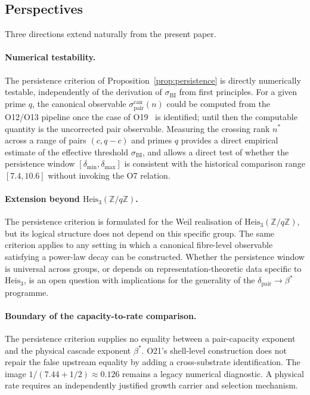 \documentclass[11pt,a4paper]{article}
\theoremstyle{definition}
\theoremstyle{remark}
\newcommand{\bstar}{\beta^*}
\begin{document}
    \subsection{Perspectives}
      \label{sec:perspectives}

      Three directions extend naturally from the present paper.

      \paragraph{Numerical testability.}
        The persistence criterion of Proposition~\ref{prop:persistence} is
        directly numerically testable, independently of the derivation of
        $\sigma_{\mathrm{BI}}$ from first principles.
        For a given prime $q$, the canonical observable
        $\sigma_{\mathrm{pair}}^{\mathrm{can}}(n)$ could be computed from the
        O12/O13 pipeline once the case of O19~\cite{Beau2026a23} is identified; until then
        the computable quantity is the uncorrected pair observable.
        Measuring the crossing rank $n^*$ across a range of pairs
        $(c, q-c)$ and primes $q$ provides a direct empirical estimate of
        the effective threshold $\sigma_{\mathrm{BI}}$, and allows a direct
        test of whether the persistence window $[\delta_{\min},
    \delta_{\max}]$ is consistent with the historical comparison range
        $[7.4, 10.6]$ without invoking the O7 relation.

      \paragraph{Extension beyond
        $\mathrm{Heis}_3(\mathbb{Z}/q\mathbb{Z})$.}
        The persistence criterion is formulated for the Weil realisation of
        $\mathrm{Heis}_3(\mathbb{Z}/q\mathbb{Z})$, but its logical structure
        does not depend on this specific group.
        The same criterion applies to any setting in which a canonical
        fibre-level observable satisfying a power-law decay can be
        constructed.
        Whether the persistence window is universal across groups, or
        depends on representation-theoretic data specific to
        $\mathrm{Heis}_3$, is an open question with implications for the
        generality of the $\delta_{\mathrm{pair}} \to \beta^*$ programme.

      \paragraph{Boundary of the capacity-to-rate comparison.}
        The persistence criterion supplies no equality between a pair-capacity exponent and
        the physical cascade exponent $\bstar$.
        O21's shell-level construction does not repair the false upstream equality by adding
        a cross-substrate identification.
        The image $1/(7.44+1/2)\approx0.126$ remains a legacy numerical diagnostic.
        A physical rate requires an independently justified growth carrier and selection mechanism.



      
      
\end{document}
